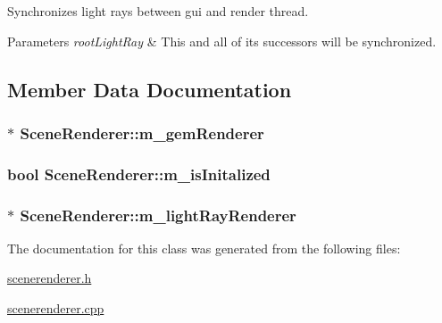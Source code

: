 Synchronizes light rays between gui and render thread. 


\begin{DoxyParams}{Parameters}
{\em root\+Light\+Ray} & This and all of its successors will be synchronized. \\
\hline
\end{DoxyParams}


\subsection{Member Data Documentation}
\hypertarget{class_scene_renderer_adf73dd839ccd615bf377b8dba695255e}{
\subsubsection[{m\+\_\+gem\+Renderer}]{$\ast$ Scene\+Renderer\+::m\+\_\+gem\+Renderer\hspace{0.3cm}{\ttfamily [protected]}}}\label{class_scene_renderer_adf73dd839ccd615bf377b8dba695255e}
\hypertarget{class_scene_renderer_acaa9426d0e8b0c913709cbd40f5f7a32}{
\subsubsection[{m\+\_\+is\+Initalized}]{\setlength{\rightskip}{0pt plus 5cm}bool Scene\+Renderer\+::m\+\_\+is\+Initalized\hspace{0.3cm}{\ttfamily [protected]}}}\label{class_scene_renderer_acaa9426d0e8b0c913709cbd40f5f7a32}
\hypertarget{class_scene_renderer_a26d9a971a57c68a46653046343f91af6}{
\subsubsection[{m\+\_\+light\+Ray\+Renderer}]{$\ast$ Scene\+Renderer\+::m\+\_\+light\+Ray\+Renderer\hspace{0.3cm}{\ttfamily [protected]}}}\label{class_scene_renderer_a26d9a971a57c68a46653046343f91af6}


The documentation for this class was generated from the following files\+:\begin{DoxyCompactItemize}
\item 
\hyperlink{scenerenderer_8h}{scenerenderer.\+h}\item 
\hyperlink{scenerenderer_8cpp}{scenerenderer.\+cpp}\end{DoxyCompactItemize}
